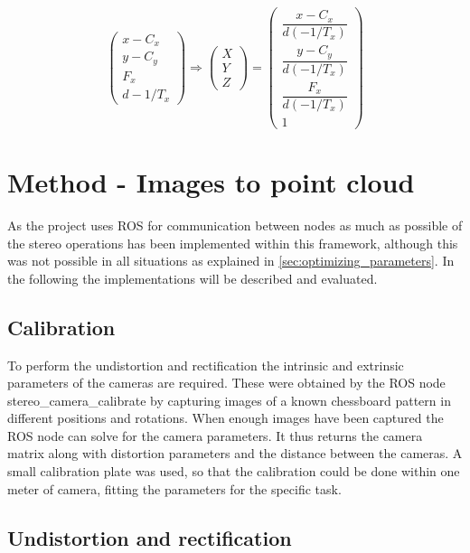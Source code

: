 \[
 \begin{pmatrix}
  x - C_{x} \\
  y - C_{y} \\
  F_{x} \\
  d-1/T_{x} 
 \end{pmatrix}
 \Rightarrow
  \begin{pmatrix}  
  X\\
  Y\\
  Z
 \end{pmatrix}
 =
 \begin{pmatrix}
  \dfrac{x - C_{x}}{ d(-1/T_{x})}  \\
  \dfrac{y - C_{y} }{ d(-1/T_{x})}\\
  \dfrac{F_{x}}{ d(-1/T_{x})}\\
  1
 \end{pmatrix}
\]

\section{Method - Images to point cloud}

As the project uses ROS for communication between nodes as much as possible of the stereo operations has been implemented within this framework, although this was not possible in all situations as explained in \ref{sec:optimizing_parameters}. In the following the implementations will be described and evaluated.

\subsection{Calibration} \label{sec:calibration}

To perform the undistortion and rectification the intrinsic and extrinsic parameters of the cameras are required. These were obtained by the ROS node stereo\_camera\_calibrate by capturing images of a known chessboard pattern in different positions and rotations. When enough images have been captured the ROS node can solve for the camera parameters. It thus returns the camera matrix along with distortion parameters and the distance between the cameras. A small calibration plate was used, so that the calibration could be done within one meter of camera, fitting the parameters for the specific task.

\subsection{Undistortion and rectification}

